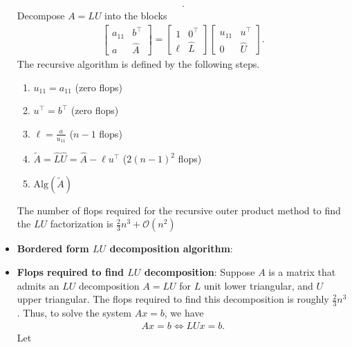 \documentclass{report}
\begin{document}
\begin{itemize}
\begin{align*}
            .\end{align*}
            Decompose $A = LU$ into the blocks
            \begin{align*}
                \begin{bmatrix}
                    a_{11} & b^{\top} \\
                    a & \hat{A}
                \end{bmatrix}
                =
                \begin{bmatrix}
                    1 & 0^{\top} \\
                    \ell & \hat{L}
                \end{bmatrix}
                \begin{bmatrix}
                    u_{11} & u^{\top} \\
                    0 & \hat{U}
                \end{bmatrix}
            .\end{align*}
            The recursive algorithm is defined by the following steps.
            \begin{enumerate}
                \item $u_{11} = a_{11} $ (zero flops)
                \item $u^{\top} = b^{\top} $ (zero flops)
                \item $\ell = \frac{a}{u_{11}} $ ($n-1$ flops) 
                \item $\tilde{A} = \hat{L}\hat{U} = \hat{A} - \ell u^{\top} $ ($2(n-1)^{2}$ flops)
                \item $\text{Alg}(\tilde{A})$
            \end{enumerate}
            The number of flops required for the recursive outer product method to find the $LU$ factorization is $\frac{2}{3}n^{3} + \mathcal{O}(n^{2}) $
        \item \textbf{Bordered form $LU$ decomposition algorithm}:
        \item \textbf{Flops required to find $LU$ decomposition}: Suppose $A$ is a matrix that admits an $LU$ decomposition $A = LU$ for $L$ unit lower triangular, and $U$ upper triangular. The flops required to find this decomposition is roughly $\frac{2}{3}n^{3}$.
            \bigbreak \noindent 
            Thus, to solve the system $Ax = b$, we have
            \begin{align*}
                Ax = b \iff LUx = b
            .\end{align*}
            Let 

\end{itemize}
\end{document}
